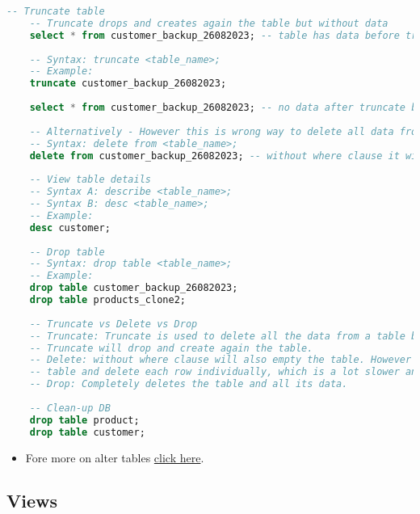 \begin{lstlisting}[language=SQL]
	-- Truncate table
	-- Truncate drops and creates again the table but without data
	select * from customer_backup_26082023; -- table has data before truncate
	
	-- Syntax: truncate <table_name>;
	-- Example:
	truncate customer_backup_26082023;
	
	select * from customer_backup_26082023; -- no data after truncate but table still exists
	
	-- Alternatively - However this is wrong way to delete all data from a table
	-- Syntax: delete from <table_name>;
	delete from customer_backup_26082023; -- without where clause it will delete all data from the table
	
	-- View table details
	-- Syntax A: describe <table_name>;
	-- Syntax B: desc <table_name>;
	-- Example:
	desc customer;
	
	-- Drop table
	-- Syntax: drop table <table_name>;
	-- Example:
	drop table customer_backup_26082023;
	drop table products_clone2;
	
	-- Truncate vs Delete vs Drop
	-- Truncate: Truncate is used to delete all the data from a table but keep the table itself.
	-- Truncate will drop and create again the table.
	-- Delete: without where clause will also empty the table. However because delete will have to go through the whole
	-- table and delete each row individually, which is a lot slower and resource intensive than truncate.
	-- Drop: Completely deletes the table and all its data.
	
	-- Clean-up DB
	drop table product;
	drop table customer;
\end{lstlisting}
\begin{itemize}
	\item Fore more on alter tables \href{https://dev.mysql.com/doc/refman/8.0/en/alter-table.html}{click here}.
\end{itemize}
\subsection{Views}
